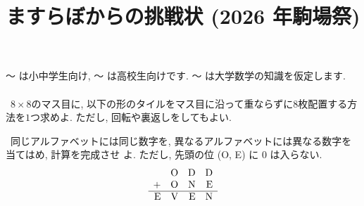 \documentclass[a4paper, 10.5pt]{jsarticle}
\theoremstyle{definition}
\begin{document}
\title{ますらぼからの挑戦状 (2026 年駒場祭)}
\author{}
\date{}
\maketitle
{} ～  は小中学生向け,  ～  は高校生向けです.  ～  は大学数学の知識を仮定します.
\\\\
\noindent{}\ $8\times 8$のマス目に, 以下の形のタイルをマス目に沿って重ならずに$8$枚配置する方法を$1$つ求めよ. ただし, 回転や裏返しをしてもよい.
\begin{center}
\end{center}

\noindent{}\ 同じアルファベットには同じ数字を, 異なるアルファベットには異なる数字を当てはめ, 計算を完成させ
よ. ただし, 先頭の位 (O, E) に 0 は入らない.
\[
    \begin{array}{rrrr}
                & \text O & \text D & \text D \\
        +       & \text O & \text N & \text E \\
        \hline
        \text E & \text V & \text E & \text N
    \end{array}
\]
\end{document}
